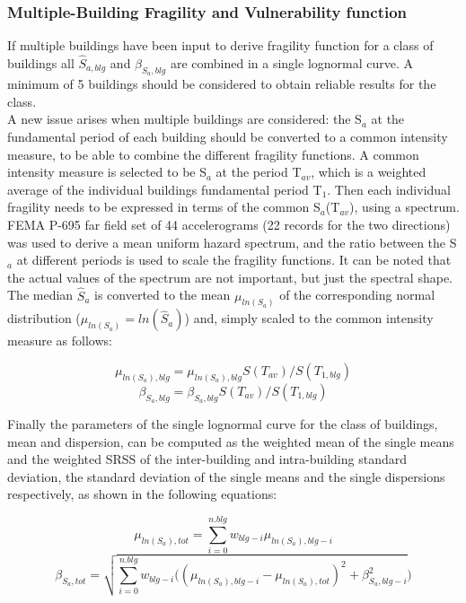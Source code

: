 \subsubsection{Multiple-Building Fragility and Vulnerability function}
\label{subsubsec:multiple-buildings}
If multiple buildings have been input to derive fragility function for a class of buildings all $\hat{S}_{a, blg}$ and $\beta_{S_a, blg}$ are combined in a single lognormal curve. A minimum of 5 buildings should be considered to obtain reliable results for the class.\\ 
A new issue arises when multiple buildings are considered: the S$_a$ at the fundamental period of each building should be converted to a common intensity measure, to be able to combine the different fragility functions. A common intensity measure is selected to be S$_a$ at the period T$_{av}$, which is a weighted average of the individual buildings fundamental period T$_1$. Then each individual fragility needs to be expressed in terms of the common S$_a$(T$_{av}$), using a spectrum. FEMA P-695 far field set of 44 accelerograms (22 records for the two directions) was used to derive a mean uniform hazard spectrum, and the ratio between the S$_a$ at different periods is used to scale the fragility functions. It can be noted that the actual values of the spectrum are not important, but just the spectral shape. 
The median $\hat{S}_a$ is converted to the mean $\mu_{ln(S_a)}$ of the corresponding normal distribution ($\mu_{ln(S_a)} = ln(\hat{S}_a)$) and, simply scaled to the common intensity measure as follows:

\begin{equation}
\mu_{ln(S_a), blg} = \mu_{ln(S_a), blg} S(T_{av})/ S(T_{1, blg})
\end{equation}
\begin{equation}
\beta_{S_a, blg} = \beta_{S_a, blg} S(T_{av})/ S(T_{1, blg})
\label{eq:Sa(Tav)}
\end{equation}

Finally the parameters of the single lognormal curve for the class of buildings, mean and dispersion, can be computed as the weighted mean of the single means and the weighted SRSS of the inter-building and intra-building standard deviation, the standard deviation of the single means and the single dispersions respectively, as shown in the following equations:

\begin{equation}
\mu_{ln(S_a), tot} = \sum_{i=0}^{n.blg} w_{blg-i} \mu_{ln(S_a), blg-i}
\label{eq:combination-lognormals-mu}
\end{equation}
\begin{equation}
\beta_{S_a, tot} = \sqrt{ \sum_{i=0}^{n.blg} w_{blg-i} ((\mu_{ln(S_a), blg-i}-\mu_{ln(S_a), tot})^2+ \beta_{S_a, blg-i}^2})
\label{eq:combination-lognormals-sigma}
\end{equation}

